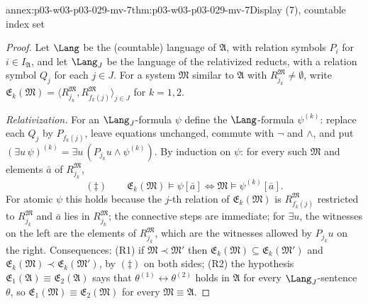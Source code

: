 \begin{annexitem}{annex:p03-w03-p03-029-mv-7}{thm:p03-w03-p03-029-mv-7}{Display (7), countable index set}
\begin{proof}
Let \(\Lang\) be the (countable) language of \(\mathfrak A\), with relation
symbols \(P_i\) for \(i\in I_{\mathfrak A}\), and let \(\Lang_J\) be the
language of the relativized reducts, with a relation symbol \(Q_j\) for each
\(j\in J\). For a system \(\mathfrak M\) similar to \(\mathfrak A\) with
\(R_{j_k}^{\mathfrak M}\neq\emptyset\), write \(\mathfrak E_k(\mathfrak M)
=\langle R_{j_k}^{\mathfrak M},R_{f_k(j)}^{\mathfrak M}\rangle_{j\in J}\) for
\(k=1,2\).

\emph{Relativization.} For an \(\Lang_J\)-formula \(\psi\) define the
\(\Lang\)-formula \(\psi^{(k)}\): replace each \(Q_j\) by \(P_{f_k(j)}\),
leave equations unchanged, commute with \(\neg\) and \(\wedge\), and put
\((\exists u\,\psi)^{(k)}=\exists u\,(P_{j_k}u\wedge\psi^{(k)})\). By
induction on \(\psi\): for every such \(\mathfrak M\) and elements
\(\bar a\) of \(R_{j_k}^{\mathfrak M}\),
\[
  (\ddagger)\qquad
  \mathfrak E_k(\mathfrak M)\models\psi[\bar a]
  \iff
  \mathfrak M\models\psi^{(k)}[\bar a].
\]
For atomic \(\psi\) this holds because the \(j\)-th relation of
\(\mathfrak E_k(\mathfrak M)\) is \(R_{f_k(j)}^{\mathfrak M}\) restricted to
\(R_{j_k}^{\mathfrak M}\) and \(\bar a\) lies in \(R_{j_k}^{\mathfrak M}\); the
connective steps are immediate; for \(\exists u\), the witnesses on the left
are the elements of \(R_{j_k}^{\mathfrak M}\), which are the witnesses
allowed by \(P_{j_k}u\) on the right. Consequences: (R1) if
\(\mathfrak M\prec\mathfrak M'\) then \(\mathfrak E_k(\mathfrak
M)\subseteq\mathfrak E_k(\mathfrak M')\) and \(\mathfrak E_k(\mathfrak
M)\prec\mathfrak E_k(\mathfrak M')\), by \((\ddagger)\) on both sides;
(R2) the hypothesis \(\mathfrak E_1(\mathfrak A)\equiv\mathfrak
E_2(\mathfrak A)\) says that \(\theta^{(1)}\leftrightarrow\theta^{(2)}\) holds
in \(\mathfrak A\) for every \(\Lang_J\)-sentence \(\theta\), so
\(\mathfrak E_1(\mathfrak M)\equiv\mathfrak E_2(\mathfrak M)\) for every
\(\mathfrak M\equiv\mathfrak A\).


\end{proof}
\end{annexitem}

